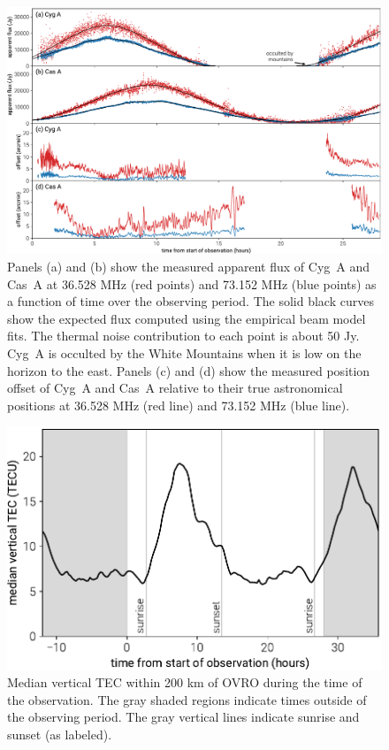 \begin{bibunit}
\begin{figure}[t]
    \includegraphics[width=\textwidth]{figures/chapter3/scintillation-refraction}
    \caption{
        Panels (a) and (b) show the measured apparent flux of Cyg~A and Cas~A at 36.528 MHz (red
        points) and 73.152 MHz (blue points) as a function of time over the observing period. The
        solid black curves show the expected flux computed using the empirical beam model fits. The
        thermal noise contribution to each point is about 50 Jy.  Cyg~A is occulted by the White
        Mountains when it is low on the horizon to the east.
        Panels (c) and (d) show the measured position offset of Cyg~A and Cas~A relative to their
        true astronomical positions at 36.528 MHz (red line) and 73.152 MHz (blue line).
    }
    \label{fig:scintillation}
\end{figure}

\begin{figure}[t]
    \includegraphics[width=\columnwidth]{figures/chapter3/vtec}
    \caption{
        Median vertical TEC within 200 km of OVRO during the time of the observation. The gray
        shaded regions indicate times outside of the observing period. The gray vertical lines
        indicate sunrise and sunset (as labeled).
    }
    \label{fig:vtec}
\end{figure}


\end{bibunit}
